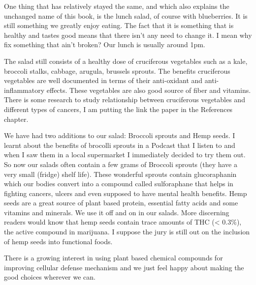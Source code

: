 \documentclass[
  oneside]{book}
\begin{document}
One thing that has relatively stayed the same, and which also explains the unchanged name of this book, is the lunch salad, of course with blueberries. It is still something we greatly enjoy eating. The fact that it is something that is healthy and tastes good means that there isn't any need to change it. I mean why fix something that ain't broken? Our lunch is usually around 1pm.

The salad still consists of a healthy dose of cruciferous vegetables such as a kale, broccoli stalks, cabbage, arugula, brussels sprouts. The benefits cruciferous vegetables are well documented in terms of their anti-oxidant and anti-inflammatory effects. These vegetables are also good source of fiber and vitamins. There is some research to study relationship between cruciferous vegetables and different types of cancers, I am putting the link the paper in the References chapter.

We have had two additions to our salad: Broccoli sprouts and Hemp seeds. I learnt about the benefits of brocolli sprouts in a Podcast that I listen to and when I saw them in a local supermarket I immediately decided to try them out. So now our salads often contain a few grams of Broccoli sprouts (they have a very small (fridge) shelf life). These wonderful sprouts contain glucoraphanin which our bodies convert into a compound called sulforaphane that helps in fighting cancers, ulcers and even supposed to have mental health benefits. Hemp seeds are a great source of plant based protein, essential fatty acids and some vitamins and minerals. We use it off and on in our salads. More discerning readers would know that hemp seeds contain trace amounts of THC (\textless{} 0.3\%), the active compound in marijuana. I suppose the jury is still out on the inclusion of hemp seeds into functional foods.

There is a growing interest in using plant based chemical compounds for improving cellular defense mechanism and we just feel happy about making the good choices wherever we can.
\end{document}
